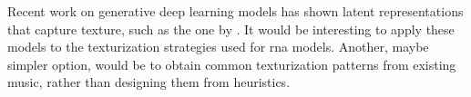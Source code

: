 
Recent work on generative deep learning models has shown
latent representations that capture texture, such as the one
by \textcite{wang2020learning}. It would be interesting to
apply these models to the texturization strategies used for
\gls{rna} models. Another, maybe simpler option, would be to
obtain common texturization patterns from existing music,
rather than designing them from heuristics.

